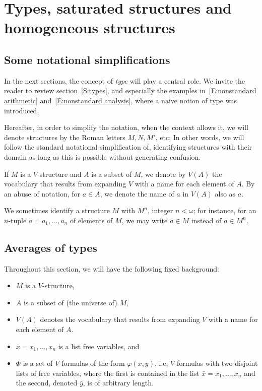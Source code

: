 \documentclass{scrartcl}
\renewcommand{\phi}{\varphi}
\begin{document}
\section{Types, saturated structures and homogeneous structures}

\subsection{Some notational simplifications}

In the next sections, the concept of \emph{type} will play a central role. We invite the reader to review section~\ref{S:types}, and especially the examples in~\ref{E:nonstandard arithmetic} and~\ref{E:nonstandard analysis}, where a naive notion of type was introduced.

Hereafter, in order to simplify the notation, when the context allows it, we will denote structures by the Roman letters $M,N,M'$, etc; In other words, we will follow the standard notational simplification of, identifying structures with their domain  as long as this is possible without generating confusion. 

If $M$ is a $V$-structure and $A$ is a subset of $M$, we denote by $V(A)$ the vocabulary that results from expanding $V$ with a name for each element of $A$. By an abuse of notation, for $a\in A$, we denote the name of $a$ in $V(A)$ also as $a$.

We sometimes identify a structure $M$ with $M^n$,  integer $n<\omega$; for instance, for an $n$-tuple $\bar a=a_1,\dots, a_n$ of elements of $M$, we may write $\bar a\in M$ instead of $\bar a\in M^n$.

\subsection{Averages of types}

Throughout this section, we will have the following fixed background:

\begin{itemize}
\item
$M$ is a $V$-structure, 
\item
$A$ is a subset of (the universe of) $M$, 
\item
$V(A)$ denotes the  vocabulary that results from expanding $V$ with a name for each element of $A$. 
\item
 $\bar x=x_1,\dots ,x_n$ is a list free variables, and
 \item
 $\Phi$ is a set of $V$-formulas of the form $\phi(\bar x,\bar y)$, i.e, $V$-formulas with two disjoint  lists of free variables, where the first is contained in the list $\bar x=x_1,\dots, x_n$ and the second, denoted $\bar y$, is of arbitrary length.
\end{itemize}
\end{document}
